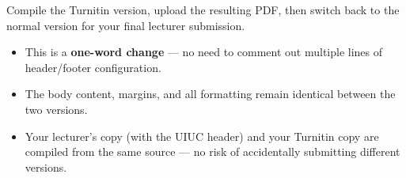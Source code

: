 Compile the Turnitin version, upload the resulting PDF, then switch back
to the normal version for your final lecturer submission.

\begin{itemize}
    \item This is a \textbf{one-word change} — no need to comment out
          multiple lines of header/footer configuration.
    \item The body content, margins, and all formatting remain identical
          between the two versions.
    \item Your lecturer's copy (with the UIUC header) and your Turnitin
          copy are compiled from the same source — no risk of accidentally
          submitting different versions.
\end{itemize}
